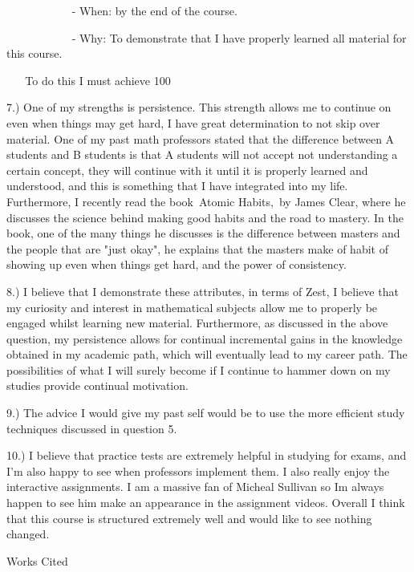 \documentclass[12pt]{article}
\newcommand{\bibent}{\noindent \hangindent 40pt}
\newenvironment{workscited}{\newpage \begin{center} Works Cited \end{center}}{\newpage }
\begin{document}
\begin{flushleft}
              - When: by the end of the course.

              - Why: To demonstrate that I have properly learned all material for this course.

    To do this I must achieve 100%

7.) One of my strengths is persistence. This strength allows me to continue on even when things may get hard, I have great determination to not skip over material. One of my past math professors stated that the difference between A students and B students is that A students will not accept not understanding a certain concept, they will continue with it until it is properly learned and understood, and this is something that I have integrated into my life. Furthermore, I recently read the book Atomic Habits, by James Clear, where he discusses the science behind making good habits and the road to mastery. In the book, one of the many things he discusses is the difference between masters and the people that are "just okay", he explains that the masters make of habit of showing up even when things get hard, and the power of consistency.

8.) I believe that I demonstrate these attributes, in terms of Zest, I believe that my curiosity and interest in mathematical subjects allow me to properly be engaged whilst learning new material. Furthermore, as discussed in the above question, my persistence allows for continual incremental gains in the knowledge obtained in my academic path, which will eventually lead to my career path. The possibilities of what I will surely become if I continue to hammer down on my studies provide continual motivation. 

9.) The advice I would give my past self would be to use the more efficient study techniques discussed in question 5.

10.) I believe that practice tests are extremely helpful in studying for exams, and I'm also happy to see when professors implement them. I also really enjoy the interactive assignments. I am a massive fan of Micheal Sullivan so Im always happen to see him make an appearance in the assignment videos. Overall I think that this course is structured extremely well and would like to see nothing changed.


\newpage



\begin{workscited}

\bibent


\end{workscited}

\end{flushleft}
\end{document}
